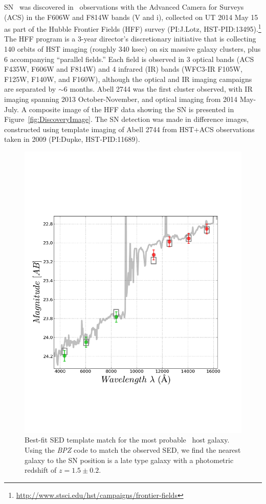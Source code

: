 SN \tomas\ was discovered in \HST\ observations with the Advanced
Camera for Surveys (ACS) in the F606W and F814W bands (V and i),
collected on UT 2014 May 15 as part of the Hubble Frontier Fields
(HFF) survey (PI:J.Lotz,
HST-PID:13495).\footnote{\url{http://www.stsci.edu/hst/campaigns/frontier-fields}}
The HFF program is a 3-year director's discretionary initiative that
is collecting 140 orbits of HST imaging (roughly 340 ksec) on six
massive galaxy clusters, plus 6 accompanying ``parallel fields.''
Each field is observed in 3 optical bands (ACS F435W, F606W and F814W)
and 4 infrared (IR) bands (WFC3-IR F105W, F125W, F140W, and F160W),
although the optical and IR imaging campaigns are separated by $\sim$6
months. Abell 2744 was the first cluster observed, with IR imaging
spanning 2013 October-November, and optical imaging from 2014
May-July.  A composite image of the HFF data showing the SN is
presented in Figure~\ref{fig:DiscoveryImage}.  The SN detection was
made in difference images, constructed using template imaging of Abell
2744 from HST+ACS observations taken in 2009 (PI:Dupke,
HST-PID:11689).



\begin{figure}
\begin{center}
\includegraphics[width=\columnwidth]{FIG/host_sed_fit}
\caption{  \label{fig:HostSED}
Best-fit SED template match for the most probable \tomas\ host
galaxy. Using the {\it BPZ} code to match the observed SED, we find
the nearest galaxy to the SN position is a late type galaxy with a
photometric redshift of $z=1.5\pm0.2$.}
\end{center}
\end{figure}

